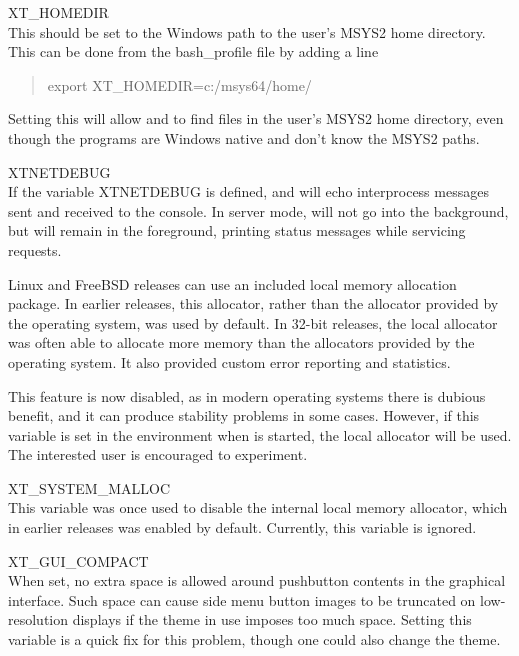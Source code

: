 \begin{description}
\item{\et XT\_HOMEDIR}\\
This should be set to the Windows path to the user's MSYS2 home
directory.  This can be done from the {\vt bash\_profile} file by
adding a line
\begin{quote}
{\vt export XT_HOMEDIR=c:/msys64/home/}{\ityourlogin}
\end{quote}
Setting this will allow {\Xic} and {\WRspice} to find files in the
user's MSYS2 home directory, even though the programs are Windows
native and don't know the MSYS2 paths.

\item{\et XTNETDEBUG}\\
If the variable {\et XTNETDEBUG} is defined, {\Xic} and {\WRspice}
will echo interprocess messages sent and received to the console.  In
server mode, {\Xic} will not go into the background, but will remain
in the foreground, printing status messages while servicing requests.

Linux and FreeBSD releases can use an included local memory allocation
package.  In earlier {\Xic} releases, this allocator, rather than the
allocator provided by the operating system, was used by default.  In
32-bit releases, the local allocator was often able to allocate more
memory than the allocators provided by the operating system.  It also
provided custom error reporting and statistics.

This feature is now disabled, as in modern operating systems there is
dubious benefit, and it can produce stability problems in some cases. 
However, if this variable is set in the environment when {\Xic} is
started, the local allocator will be used.  The interested user is
encouraged to experiment.

\item{\et XT\_SYSTEM\_MALLOC}\\
This variable was once used to disable the internal local memory
allocator, which in earlier releases was enabled by default. 
Currently, this variable is ignored.

\item{\et XT\_GUI\_COMPACT}\\
When set, no extra space is allowed around pushbutton contents in the
graphical interface.  Such space can cause side menu button images to
be truncated on low-resolution displays if the theme in use imposes
too much space.  Setting this variable is a quick fix for this
problem, though one could also change the theme.
\end{description}

